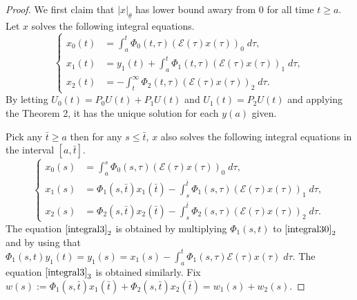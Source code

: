 \documentclass[a4paper,11pt]{article}
\newcommand{\tl}{{\underline{\theta}}}
\newcommand{\bt}{{\bar{t}}}
\newcommand{\E}{\mathcal{E}}
\newcounter{Theorem}
\theoremstyle{remark}
\begin{document}
\begin{proof}
 We first claim that $|x|_\tl$ has lower bound awary from $0$ for all time $t\ge a$.  Let $x$ solves the following integral equations.
\begin{equation} \label{integral30}
  \left\{ \begin{aligned}
           x_0(t) &= \int_a^t \Phi_0(t,\tau) (\E(\tau)x(\tau))_0 \; d\tau,\\
           x_1(t) &= y_1(t) + \int_a^t \Phi_1(t,\tau) (\E(\tau)x(\tau))_1 \; d\tau,\\
           x_2(t) &= -\int_{t}^\infty \Phi_2(t,\tau) (\E(\tau)x(\tau))_2 \; d\tau.
          \end{aligned}\right.
\end{equation}
By letting $U_0(t) = P_0U(t) + P_1U(t)$ and $U_1(t)=P_2U(t)$ and applying the Theorem 2, it has the unique solution for each $y(a)$ given.

Pick any $\bar{t} \ge a$ then for any $s \le \bar{t}$, $x$ also solves the following integral equations in the interval $[a,\bt]$.
\begin{equation} \label{integral3}
  \left\{ \begin{aligned}
           x_0(s) &= \int_a^s \Phi_0(s,\tau) (\E(\tau)x(\tau))_0 \; d\tau,\\
           x_1(s) &= \Phi_1(s,\bar{t})x_1(\bar{t}) - \int_s^{\bar{t}} \Phi_1(s,\tau) (\E(\tau)x(\tau))_1 \; d\tau,\\
           x_2(s) &= \Phi_2(s,\bar{t})x_2(\bar{t}) - \int_s^{\bar{t}} \Phi_2(s,\tau) (\E(\tau)x(\tau))_2 \; d\tau.
          \end{aligned}\right.
\end{equation}
The equation $\eqref{integral3}_2$ is obtained by multiplying $\Phi_1(s,t)$ to $\eqref{integral30}_2$ and by using that $\Phi_1(s,t)y_1(t) = y_1(s) = x_1(s) - \int_a^t \Phi_1(s,\tau)\E(\tau) x(\tau) \; d\tau$. The equation $\eqref{integral3}_3$ is obtained similarly. Fix $w(s):=\Phi_1(s,\bar{t})x_1(\bar{t}) + \Phi_2(s,\bar{t})x_2(\bar{t}) = w_1(s)+w_2(s)$. 


\end{proof}
\end{document}

